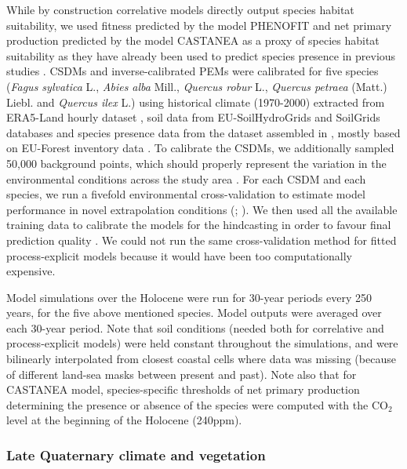 While by construction correlative models directly output species habitat suitability, we used fitness predicted by the model PHENOFIT and net primary production predicted by the model CASTANEA as a proxy of species habitat suitability as they have already been used to predict species presence in previous studies \citep{Morin2009, Cheaib2012, Saltre2013}. CSDMs and inverse-calibrated PEMs were calibrated for five species (\textit{Fagus sylvatica} L., \textit{Abies alba} Mill., \textit{Quercus robur} L., \textit{Quercus petraea}  (Matt.) Liebl. and \textit{Quercus ilex} L.) using historical climate (1970-2000) extracted from ERA5-Land hourly dataset \citep{MunozSabater2021}, soil data from EU-SoilHydroGrids \citep{Toth2017} and SoilGrids \citep{Hengl2017} databases and species presence data from the dataset assembled in \cite{VanderMeersch2023}, mostly based on EU-Forest inventory data \citep{Mauri2017}. To calibrate the CSDMs, we additionally sampled 50,000 background points, which should properly represent the variation in the environmental conditions across the study area \citep{Valavi2022}. For each CSDM and each species, we run a fivefold environmental cross-validation to estimate model performance in novel extrapolation conditions (; \citealp{Roberts2017}). We then used all the available training data to calibrate the models for the hindcasting in order to favour final prediction quality \citep{Roberts2017}. We could not run the same cross-validation method for fitted process-explicit models because it would have been too computationally expensive. 

Model simulations over the Holocene were run for 30-year periods every 250 years, for the five above mentioned species. Model outputs were averaged over each 30-year period. Note that soil conditions (needed both for correlative and process-explicit models) were held constant throughout the simulations, and were bilinearly interpolated from closest coastal cells where data was missing (because of different land-sea masks between present and past). Note also that for CASTANEA model, species-specific thresholds of net primary production determining the presence or absence of the species were computed with the CO$_2$ level at the beginning of the Holocene (\textappr240ppm).

\subsubsection{Late Quaternary climate and vegetation}\label{paleodata}

